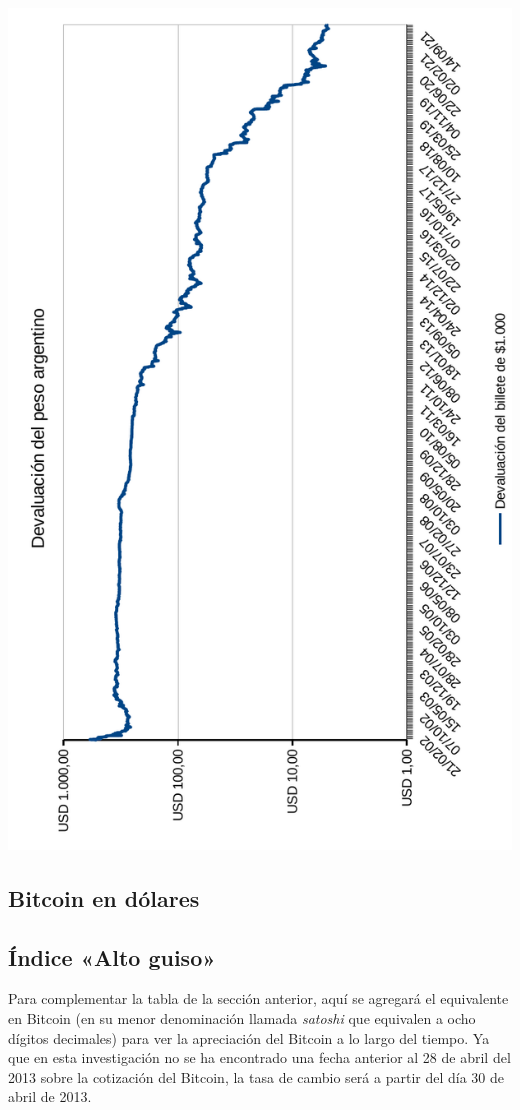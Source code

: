 \documentclass[12pt,a4paper,twoside]{book}
\begin{document}
\newpage

\begin{center}
\includegraphics[scale=0.975,angle=180]{img/deval-peso.pdf}
\end{center}
\newpage

\subsection{Bitcoin en dólares}


\newpage

\subsection{Índice «Alto guiso»}
Para complementar la tabla de la sección anterior, aquí se agregará el equivalente en Bitcoin (en su menor denominación llamada \textit{satoshi} que equivalen a ocho dígitos decimales) para ver la apreciación del Bitcoin a lo largo del tiempo. Ya que en esta investigación no se ha encontrado una fecha anterior al 28 de abril del 2013 sobre la cotización del Bitcoin, la tasa de cambio será a partir del día 30 de abril de 2013.
\end{document}
